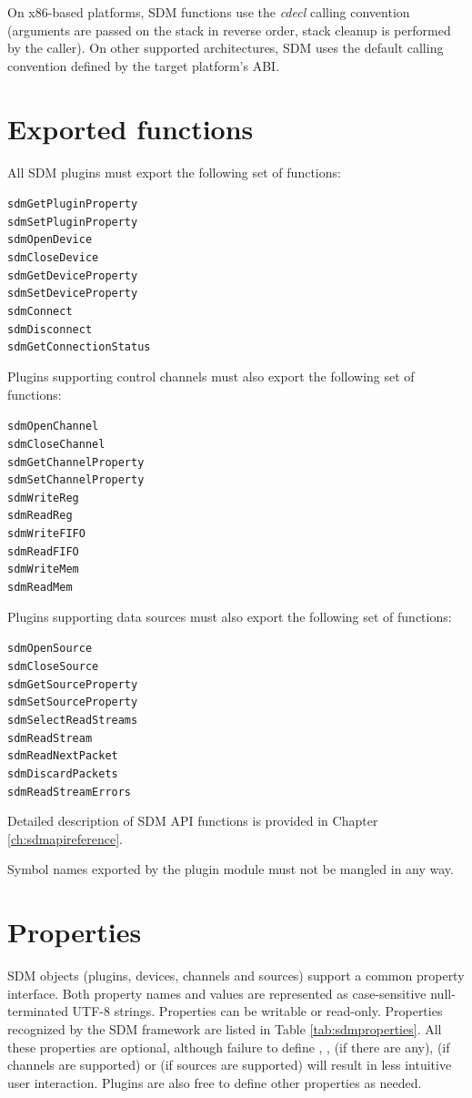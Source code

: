 \documentclass[a4paper,12pt,twoside,extrafontsizes]{memoir}
\begin{document}
On x86-based platforms, SDM functions use the \emph{cdecl} calling convention (arguments are passed on the stack in reverse order, stack cleanup is performed by the caller). On other supported architectures, SDM uses the default calling convention defined by the target platform's ABI.

\section{Exported functions}
\label{sec:sdmexport}

All SDM plugins must export the following set of functions:

\begin{alltt}
	sdmGetPluginProperty
	sdmSetPluginProperty
	sdmOpenDevice
	sdmCloseDevice
	sdmGetDeviceProperty
	sdmSetDeviceProperty
	sdmConnect
	sdmDisconnect
	sdmGetConnectionStatus
\end{alltt}

Plugins supporting control channels must also export the following set of functions:

\begin{alltt}
	sdmOpenChannel
	sdmCloseChannel
	sdmGetChannelProperty
	sdmSetChannelProperty
	sdmWriteReg
	sdmReadReg
	sdmWriteFIFO
	sdmReadFIFO
	sdmWriteMem
	sdmReadMem
\end{alltt}

Plugins supporting data sources must also export the following set of functions:

\begin{alltt}
	sdmOpenSource
	sdmCloseSource
	sdmGetSourceProperty
	sdmSetSourceProperty
	sdmSelectReadStreams
	sdmReadStream
	sdmReadNextPacket
	sdmDiscardPackets
	sdmReadStreamErrors
\end{alltt}

Detailed description of SDM API functions is provided in Chapter \ref{ch:sdmapireference}.

Symbol names exported by the plugin module must not be mangled in any way.

\section{Properties}
\label{sec:properties}

SDM objects (plugins, devices, channels and sources) support a common property interface. Both property names and values are represented as case-sensitive null-terminated UTF-8 strings. Properties can be writable or read-only. Properties recognized by the SDM framework are listed in Table \ref{tab:sdmproperties}. All these properties are optional, although failure to define , ,  (if there are any),  (if channels are supported) or  (if sources are supported) will result in less intuitive  user interaction. Plugins are also free to define other properties as needed.
\end{document}
